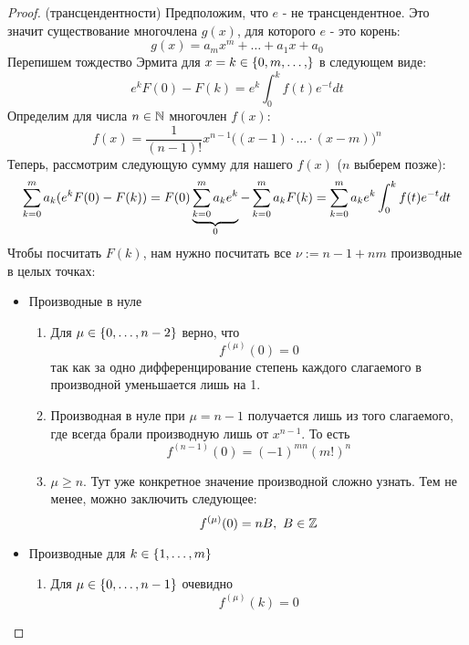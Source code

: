\begin{proof} (трансцендентности)
	Предположим, что $e$ - не трансцендентное. Это значит существование многочлена $g(x)$, для которого $e$ - это корень:
	\[
		g(x) = a_m x^m + \ldots + a_1 x + a_0
	\]
	Перепишем тождество Эрмита для $x = k \in \range{0, m}$ в следующем виде:
	\[
		e^k F(0) - F(k) = e^k \int_0^k f(t) e^{-t} dt
	\]
	Определим для числа $n \in \mathbb{N}$ многочлен $f(x)$:
	\[
		f(x) = \frac{1}{(n - 1)!} x^{n - 1} \big((x - 1) \cdot \ldots \cdot (x - m)\big)^n
	\]
	Теперь, рассмотрим следующую сумму для нашего $f(x)$ ($n$ выберем позже):
	\[
		\sum\limits_{k = 0}^m a_k (e^k F(0) - F(k)) = F(0) \underbrace{\sum\limits_{k = 0}^m a_k e^k}_{0} - \sum\limits_{k = 0}^m a_k F(k) = \sum\limits_{k = 0}^m a_k e^k \int_0^k f(t) e^{-t} dt 
	\]
	Чтобы посчитать $F(k)$, нам нужно посчитать все $\nu := n - 1 + nm$ производные в целых точках:
	\begin{itemize}
		\item Производные в нуле
		\begin{enumerate}
			\item Для $\mu \in \{0, \ldots, n - 2\}$ верно, что
			\[
				f^{(\mu)}(0) = 0
			\]
			так как за одно дифференцирование степень каждого слагаемого в производной уменьшается лишь на 1.
			
			\item Производная в нуле при $\mu = n - 1$ получается лишь из того слагаемого, где всегда брали производную лишь от $x^{n - 1}$. То есть
			\[
				f^{(n - 1)}(0) = (-1)^{mn} (m!)^n
			\]
			
			\item $\mu \ge n$. Тут уже конкретное значение производной сложно узнать. Тем не менее, можно заключить следующее:
			\[
				f^{(\mu)}(0) = nB,\ B \in \mathbb{Z}
			\]
		\end{enumerate}
		
		\item Производные для $k \in \{1, \ldots, m\}$
		\begin{enumerate}
			\item Для $\mu \in \{0, \ldots, n - 1\}$ очевидно
			\[
				f^{(\mu)}(k) = 0
			\]
			

\end{enumerate}
\end{itemize}
\end{proof}
